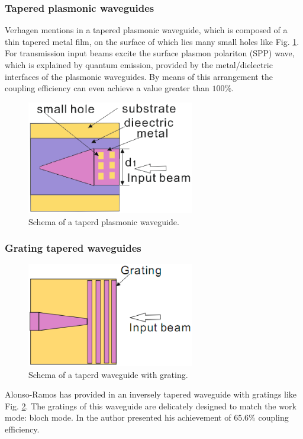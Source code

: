 \subsubsection*{Tapered plasmonic waveguides}%
Verhagen mentions in \cite{tapered_plasmonic_waveguides} a tapered plasmonic waveguide, which is composed of a thin tapered metal film, on the surface of which lies many small holes like Fig. \ref{fig:tapered_waveguide_plasmonic}. For transmission input beams excite the surface plasmon polariton (SPP) wave, which is explained by quantum emission, provided by the metal/dielectric interfaces of the plasmonic waveguides. By means of this arrangement the coupling efficiency can even achieve a value greater than $100\%$.\\

\begin{figure}[!ht]
\centering
\includegraphics[width=0.65\textwidth]{bilder/tapered_waveguide_plasmonic}
\caption{Schema of a taperd plasmonic waveguide.}
\label{fig:tapered_waveguide_plasmonic}
\end{figure}
\subsubsection*{Grating tapered waveguides}%
\begin{figure}[!ht]
\centering
\includegraphics[width=0.65\textwidth]{bilder/tapered_waveguide_grating}
\caption{Schema of a taperd waveguide with grating.}
\label{fig:tapered_waveguide_grating}
\end{figure}
Alonso-Ramos has provided in \cite{fiber_to_chip_grating_waveguides} an inversely tapered waveguide with gratings like Fig. \ref{fig:tapered_waveguide_grating}. The gratings of this waveguide are delicately designed to match the work mode: bloch mode. In \cite{fiber_to_chip_grating_waveguides} the author presented his achievement of $65.6\%$ coupling efficiency. \\
 
